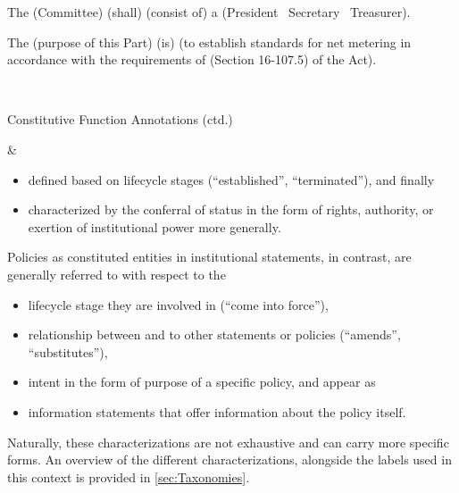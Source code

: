 \begin{landscape}
\begin{longtable}{\tabledims}
\vspace{2.5cm}

\begin{exi}
The \E{}(Committee) \M{}(shall) \F{}(consist of) a \Pp{}(\lpconst President \ANDconst~Secretary
\ANDconst~Treasurer\rpconst).\end{exi}

\vspace{1.55cm}

\begin{exi}
The \E{}(purpose of this Part) \F{}(is) \Pp{}(to establish standards for net metering in accordance with the requirements of (Section 16-107.5) of the Act).\end{exi}

\\

\begin{emp}Constitutive Function Annotations (ctd.)\end{emp}

&

\begin{itemize}
\item defined based on lifecycle stages (``established'', ``terminated''), and finally 
\item characterized by the conferral of status in the form of rights, authority, or exertion of institutional power more generally.
\end{itemize}

Policies as constituted entities in institutional statements, in contrast, are generally referred to with respect to the 
\begin{itemize}
\item lifecycle stage they are involved in (``come into force''), 
\item relationship between and to other statements or policies (``amends'', ``substitutes''), 
\item intent in the form of purpose of a specific policy, and appear as 
\item information statements that offer information about the policy itself.
\end{itemize}


Naturally, these characterizations are not exhaustive and can carry more specific forms. An overview of the different characterizations, alongside the labels used in this context is provided in \cref{sec:Taxonomies}.


\end{longtable}
\end{landscape}
